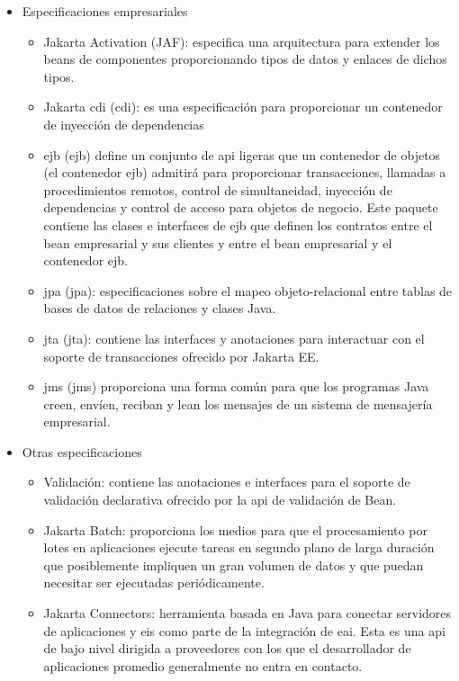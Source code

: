 \begin{itemize}
   \item Especificaciones empresariales
     \begin{itemize}
        \item Jakarta Activation (JAF): especifica una arquitectura para extender los beans de componentes proporcionando tipos de datos y enlaces de dichos tipos. 
        \item Jakarta \acrshort{cdi} (\acrlong{cdi}): es una especificación para proporcionar un contenedor de inyección de dependencias
        \item \acrshort{ejb} (\acrlong{ejb}) define un conjunto de \acrshort{api} ligeras que un contenedor de objetos (el contenedor \acrshort{ejb}) admitirá para proporcionar transacciones, llamadas a procedimientos remotos, control de simultaneidad, inyección de dependencias y control de acceso para objetos de negocio. Este paquete contiene las clases e interfaces de \acrshort{ejb} que definen los contratos entre el bean empresarial y sus clientes y entre el bean empresarial y el contenedor ejb. 
        \item \acrshort{jpa} (\acrlong{jpa}): especificaciones sobre el mapeo objeto-relacional entre tablas de bases de datos de relaciones y clases Java.
        \item \acrshort{jta} (\acrlong{jta}): contiene las interfaces y anotaciones para interactuar con el soporte de transacciones ofrecido por Jakarta EE.
	    \item \acrshort{jms} (\acrlong{jms}) proporciona una forma común para que los programas Java creen, envíen, reciban y lean los mensajes de un sistema de mensajería empresarial.      
     \end{itemize}
     
   \item Otras especificaciones
     \begin{itemize}
        \item Validación: contiene las anotaciones e interfaces para el soporte de validación declarativa ofrecido por la \acrshort{api} de validación de Bean. 
		\item Jakarta Batch: proporciona los medios para que el procesamiento por lotes en aplicaciones ejecute tareas en segundo plano de larga duración que posiblemente impliquen un gran volumen de datos y que puedan necesitar ser ejecutadas periódicamente. 
		\item Jakarta Connectors: herramienta basada en Java para conectar servidores de aplicaciones y \acrfull{eis} como parte de la integración de \acrfull{eai}. Esta es una \acrshort{api} de bajo nivel dirigida a proveedores con los que el desarrollador de aplicaciones promedio generalmente no entra en contacto.
     \end{itemize}
\end{itemize}




